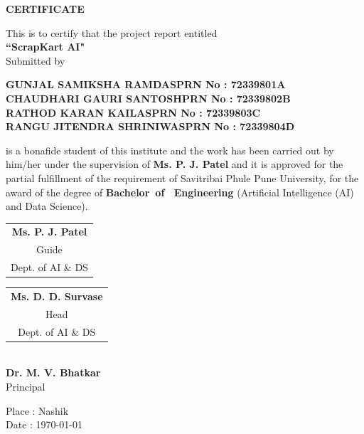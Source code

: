 \newpage 

\cleardoublepage
\thispagestyle{empty}
\begin{center}
    \textbf{\LARGE  CERTIFICATE \\ [0.2cm]}
\end{center}
\vspace{1cm}

{\centering This is to certify that the project report entitled\\[0.2cm]
 {\large \textbf{``ScrapKart AI"}}\\[0.3cm]
 Submitted by\\[0.2cm]}
 
\begin{center}
  {\normalsize \textbf{GUNJAL SAMIKSHA RAMDAS}}\hfill {\normalsize \textbf{PRN No : 72339801A }}\\
    {\normalsize \textbf{CHAUDHARI GAURI SANTOSH}}\hfill {\normalsize \textbf{PRN No : 72339802B }}\\
    {\normalsize \textbf{RATHOD KARAN KAILAS}}\hfill {\normalsize \textbf{PRN No : 72339803C }}\\
     {\normalsize \textbf{RANGU JITENDRA SHRINIWAS}}\hfill {\normalsize \textbf{PRN No : 72339804D }}\\
  \end{center}   
 is a bonafide student of this institute and the work has been carried out by him/her under the supervision of \textbf{ Ms. P. J. Patel }and it is approved for the partial fulfillment of the requirement of Savitribai Phule Pune University, for the award of the degree of \textbf{Bachelor~of ~Engineering} (Artificial Intelligence (AI) and Data Science).

\vspace{1.5cm}
\begin{center}
\noindent \begin{tabular}{c}
\textbf{Ms. P. J. Patel} \\
Guide \\
Dept. of AI \& DS
\end{tabular}
\hfill
\begin{tabular}{c}
\textbf{Ms. D. D. Survase }\\
Head \\
Dept. of AI \& DS
\end{tabular}\\[1cm]
\textbf{Dr. M. V. Bhatkar}\\
Principal\\[1cm]
\end{center}
Place : Nashik\\
Date : \today

